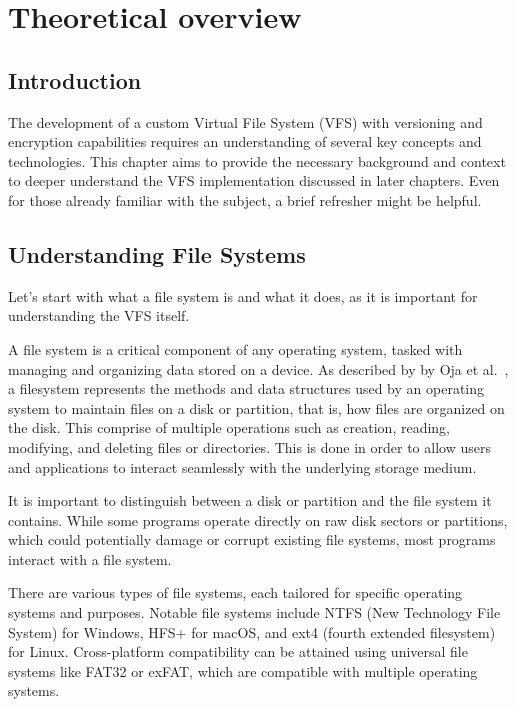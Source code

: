 \chapter{Theoretical overview}
\label{chap:refs}


\section{Introduction}\label{sec:introduction}

The development of a custom Virtual File System (VFS) with versioning and encryption capabilities requires an understanding of several key concepts and technologies.
This chapter aims to provide the necessary background and context to deeper understand the VFS implementation discussed in later chapters.
Even for those already familiar with the subject, a brief refresher might be helpful.


\section{Understanding File Systems}\label{sec:file-systems}

Let's start with what a file system is and what it does, as it is important for understanding the VFS itself.

A file system is a critical component of any operating system, tasked with managing and organizing data stored on a device.
As described by by Oja et al.~\cite{oja-fs}, a filesystem represents the methods and data structures used by an operating system to maintain files on a disk or partition, that is, how files are organized on the disk.
This comprise of multiple operations such as creation, reading, modifying, and deleting files or directories.
This is done in order to allow users and applications to interact seamlessly with the underlying storage medium.

It is important to distinguish between a disk or partition and the file system it contains.
While some programs operate directly on raw disk sectors or partitions, which could potentially damage or corrupt existing file systems, most programs interact with a file system.

There are various types of file systems, each tailored for specific operating systems and purposes.
Notable file systems include NTFS (New Technology File System) for Windows, HFS+ for macOS, and ext4 (fourth extended filesystem) for Linux.
Cross-platform compatibility can be attained using universal file systems like FAT32 or exFAT, which are compatible with multiple operating systems.

